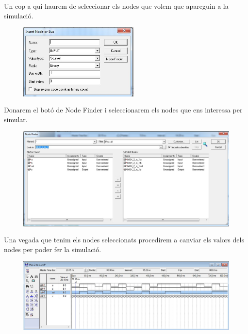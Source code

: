 \documentclass[12pt, a4papre]{article}
\begin{document}
	Un cop a qui haurem de seleccionar els nodes que volem que apareguin a la simulació.
	\begin{figure}[H]
		\begin{center}
		\includegraphics[width=60mm]{Insertnode.jpeg}
		\end{center}
	\end{figure}
	
	Donarem el botó de Node Finder i seleccionarem els nodes que ens interessa per simular.
	
		\begin{figure}[H]
		\begin{center}
		\includegraphics[width=150mm]{nodes.jpeg}
		\end{center}
	\end{figure}
	
	Una vegada que tenim els nodes seleccionats procedirem a canviar els valors dels nodes per poder fer la simulació.
	
		\begin{figure}[H]
		\begin{center}
		\includegraphics[width=150mm]{simulacioambvalors.jpeg}
		\end{center}
	\end{figure}
	
\end{document}
